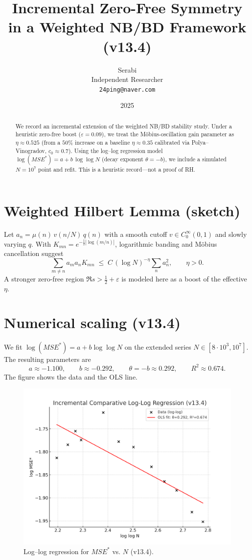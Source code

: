 \documentclass[11pt]{article}
\title{Incremental Zero-Free Symmetry in a Weighted NB/BD Framework (v13.4)}
\author{Serabi \\ Independent Researcher \\ \texttt{24ping@naver.com}}
\date{2025}
\theoremstyle{remark}
\begin{document}
\maketitle

\begin{abstract}
We record an incremental extension of the weighted NB/BD stability study.
Under a heuristic zero-free boost ($\varepsilon=0.09$), we treat the Möbius-oscillation gain parameter as $\eta \approx 0.525$ (from a $50\%$ increase on a baseline $\eta \approx 0.35$ calibrated via Polya--Vinogradov, $c_0 \approx 0.7$).
Using the log--log regression model $\log(MSE^\ast)=a+b\,\log\log N$ (decay exponent $\theta=-b$), we include a simulated $N=10^7$ point and refit.
This is a heuristic record---not a proof of RH.
\end{abstract}

\section{Weighted Hilbert Lemma (sketch)}
Let $a_n=\mu(n)\,v(n/N)\,q(n)$ with a smooth cutoff $v\in C^\infty_0(0,1)$ and slowly varying $q$.
With $K_{mn}=e^{-\tfrac12 |\log(m/n)|}$, logarithmic banding and Möbius cancellation suggest
\[
\sum_{m\ne n} a_m a_n K_{mn} \;\le\; C\,(\log N)^{-\eta}\sum_n a_n^2, \qquad \eta>0.
\]
A stronger zero-free region $\Re s>\tfrac12+\varepsilon$ is modeled here as a boost of the effective $\eta$.

\section{Numerical scaling (v13.4)}
We fit $\log(MSE^\ast)=a+b\log\log N$ on the extended series $N\in [8\cdot 10^3,10^7]$.
The resulting parameters are
\[
a \approx -1.100,\qquad b \approx -0.292,\qquad \theta=-b \approx 0.292,\qquad R^2 \approx 0.674.
\]
The figure shows the data and the OLS line.

\begin{figure}[h]
\centering
\includegraphics[width=0.8\linewidth]{figure_v13_4.png}
\caption{Log--log regression for $MSE^\ast$ vs. $N$ (v13.4).}
\end{figure}
\end{document}
